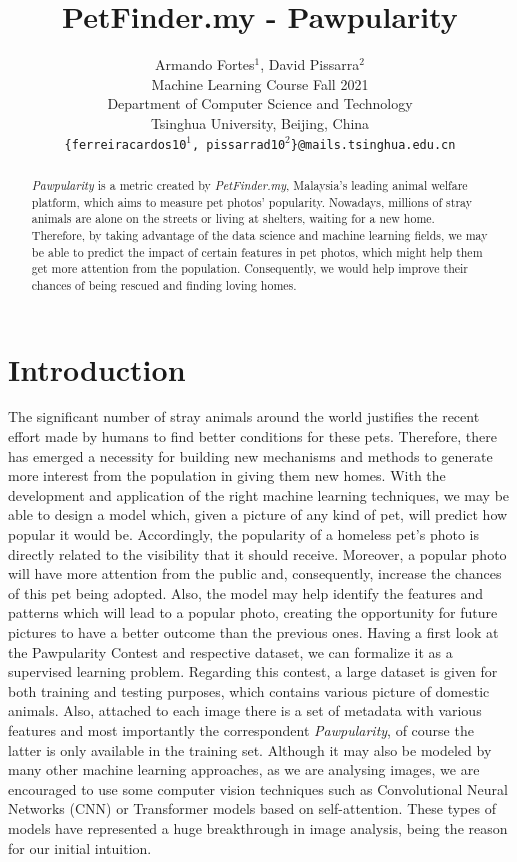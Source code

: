 \documentclass{article}
\title{PetFinder.my - Pawpularity}
\author{
  Armando Fortes$^1$, David Pissarra$^2$\\
  Machine Learning Course Fall 2021\\
  Department of Computer Science and Technology\\
  Tsinghua University, Beijing, China\\
  \small \texttt{\{ferreiracardos10$^1$, pissarrad10$^2$\}@mails.tsinghua.edu.cn}\\
}
\begin{document}
\maketitle

\begin{abstract}

\textit{Pawpularity} is a metric created by \textit{PetFinder.my}, Malaysia's leading animal welfare platform, which aims to measure pet photos' popularity. Nowadays, millions of stray animals are alone on the streets or living at shelters, waiting for a new home. Therefore, by taking advantage of the data science and machine learning fields, we may be able to predict the impact of certain features in pet photos, which might help them get more attention from the population. Consequently, we would help improve their chances of being rescued and finding loving homes.

\end{abstract}

\section{Introduction}

The significant number of stray animals around the world justifies the recent effort made by humans to find better conditions for these pets. Therefore, there has emerged a necessity for building new mechanisms and methods to generate more interest from the population in giving them new homes. With the development and application of the right machine learning techniques, we may be able to design a model which, given a picture of any kind of pet, will predict how popular it would be. Accordingly, the popularity of a homeless pet's photo is directly related to the visibility that it should receive. Moreover, a popular photo will have more attention from the public and, consequently, increase the chances of this pet being adopted. Also, the model may help identify the features and patterns which will lead to a popular photo, creating the opportunity for future pictures to have a better outcome than the previous ones.
Having a first look at the Pawpularity Contest \cite{kaggle_petfinder.my_2021} and respective dataset, we can formalize it as a supervised learning problem. Regarding this contest, a large dataset is given for both training and testing purposes, which contains various picture of domestic animals. Also, attached to each image there is a set of metadata with various features and most importantly the correspondent \textit{Pawpularity}, of course the latter is only available in the training set. Although it may also be modeled by many other machine learning approaches, as we are analysing images, we are encouraged to use some computer vision techniques such as Convolutional Neural Networks (CNN) or Transformer models based on self-attention. These types of models have represented a huge breakthrough in image analysis, being the reason for our initial intuition.
\end{document}
